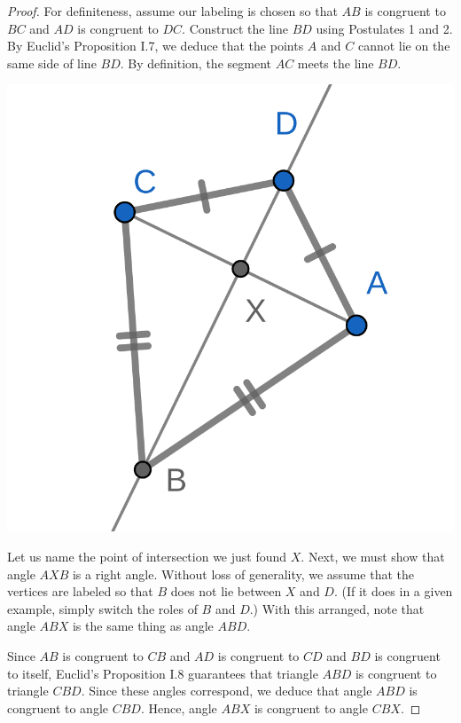 \documentclass{tufte-handout}
\theoremstyle{definition}
\begin{document}
\begin{proof}
For definiteness, assume our labeling is chosen so that $AB$ is congruent to $BC$ and $AD$ is congruent to $DC$. Construct the line $BD$ using Postulates 1 and 2. By Euclid's Proposition I.7, we deduce that the points $A$ and $C$ cannot lie on the same side of line $BD$. By definition, the segment $AC$ meets the line $BD$.

\begin{marginfigure}
  \includegraphics{images/kite_diags_meet_1.png}
\end{marginfigure}

Let us name the point of intersection we just found $X$. Next, we must show that angle $AXB$ is a right angle. Without loss of generality, we assume that the vertices are labeled so that $B$ does not lie between $X$ and $D$. (If it does in a given example, simply switch the roles of $B$ and $D$.)
With this arranged, note that angle $ABX$ is the same thing as angle $ABD$.

Since $AB$ is congruent to $CB$ and $AD$ is congruent to $CD$ and $BD$ is congruent to itself, Euclid's Proposition I.8 guarantees that triangle $ABD$ is congruent to triangle $CBD$. Since these angles correspond, we deduce that angle $ABD$ is congruent to angle $CBD$. Hence, angle $ABX$ is congruent to angle $CBX$.


\end{proof}
\end{document}
